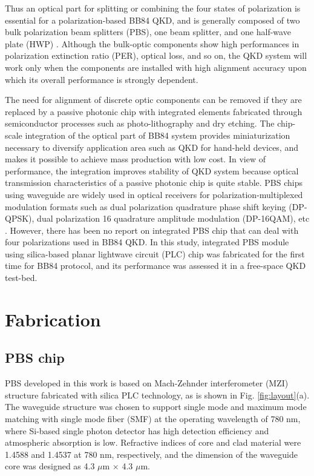 \documentclass[letterpaper, 10pt]{article}
\begin{document}
Thus an optical part for splitting or combining the four states of polarization is essential for a polarization-based BB84 QKD, and is generally composed of two bulk polarization beam splitters (PBS), one beam splitter, and one half-wave plate (HWP) \cite{Ko:2017cs}.
Although the bulk-optic components show high performances in polarization extinction ratio (PER), optical loss, and so on, the QKD system will work only when the components are installed with high alignment accuracy upon which its overall performance is strongly dependent.


The need for alignment of discrete optic components can be removed if they are replaced by  a passive photonic chip with integrated elements
fabricated through semiconductor processes such as photo-lithography and dry etching.
The chip-scale integration of the optical part of BB84 system provides miniaturization necessary to diversify application area such as QKD for hand-held devices, and makes it possible to achieve mass production with low cost.
In view of performance, the integration improves stability of QKD system because optical transmission characteristics of a passive photonic chip is quite stable.
PBS chips using waveguide are widely used in optical receivers for polarization-multiplexed modulation formats such as dual polarization quadrature phase shift keying (DP-QPSK), dual polarization 16 quadrature amplitude modulation (DP-16QAM), etc  \cite{Lee:2016bg,PoDong:2014kj}.
However, there has been no report on integrated PBS chip that can deal with four polarizations used in BB84 QKD.
In this study, integrated PBS module using  silica-based planar lightwave circuit (PLC) chip was fabricated for the first time for BB84 protocol, and its performance was assessed it in a free-space QKD test-bed.

\section{Fabrication}
\subsection{PBS chip}


PBS developed in this work is based on Mach-Zehnder interferometer (MZI) structure fabricated with silica PLC technology, as is shown in Fig. \ref{fig:layout}(a)\cite{Kim:2012ej, Hashizume:2015ta}.
The waveguide structure was chosen to support single mode and maximum mode matching with single mode fiber (SMF) at the operating wavelength of 780 nm, where Si-based single photon detector has high detection efficiency and atmospheric absorption is low.
Refractive indices of core and clad material were 1.4588 and 1.4537 at 780 nm, respectively, and the dimension of the waveguide core was designed as 4.3 $\mu$m $\times$ 4.3 $\mu$m.
\end{document}
